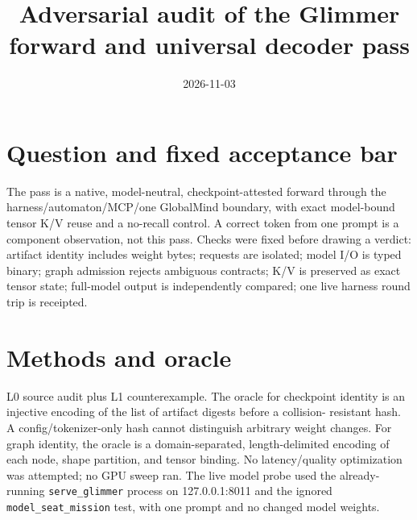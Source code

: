 \documentclass{article}
\begin{document}
\title{Adversarial audit of the Glimmer forward and universal decoder pass}
\date{2026-11-03}
\maketitle

\section*{Question and fixed acceptance bar}
The pass is a native, model-neutral, checkpoint-attested forward through the
harness/automaton/MCP/one GlobalMind boundary, with exact model-bound tensor
K/V reuse and a no-recall control. A correct token from one prompt is a
component observation, not this pass. Checks were fixed before drawing a
verdict: artifact identity includes weight bytes; requests are isolated;
model I/O is typed binary; graph admission rejects ambiguous contracts;
K/V is preserved as exact tensor state; full-model output is independently
compared; one live harness round trip is receipted.

\section*{Methods and oracle}
L0 source audit plus L1 counterexample. The oracle for checkpoint identity is
an injective encoding of the list of artifact digests before a collision-
resistant hash. A config/tokenizer-only hash cannot distinguish arbitrary
weight changes. For graph identity, the oracle is a domain-separated,
length-delimited encoding of each node, shape partition, and tensor binding.
No latency/quality optimization was attempted; no GPU sweep ran. The live
model probe used the already-running \texttt{serve\_glimmer} process on
127.0.0.1:8011 and the ignored \texttt{model\_seat\_mission} test, with one
prompt and no changed model weights.
\end{document}
